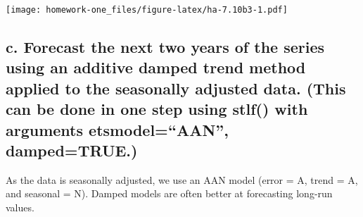 \documentclass[openany]{book}
\newenvironment{Shaded}{\begin{snugshade}}{\end{snugshade}}
\newcommand{\DataTypeTok}[1]{\textcolor[rgb]{0.13,0.29,0.53}{#1}}
\newcommand{\KeywordTok}[1]{\textcolor[rgb]{0.13,0.29,0.53}{\textbf{#1}}}
\newcommand{\NormalTok}[1]{#1}
\newcommand{\OperatorTok}[1]{\textcolor[rgb]{0.81,0.36,0.00}{\textbf{#1}}}
\newcommand{\StringTok}[1]{\textcolor[rgb]{0.31,0.60,0.02}{#1}}
\begin{document}
\begin{Shaded}
\end{Shaded}

\texttt{[image: homework-one\_files/figure-latex/ha-7.10b3-1.pdf]}

\hypertarget{c.-forecast-the-next-two-years-of-the-series-using-an-additive-damped-trend-method-applied-to-the-seasonally-adjusted-data.-this-can-be-done-in-one-step-using-stlf-with-arguments-etsmodelaan-dampedtrue.}{%
\subsection{c. Forecast the next two years of the series using an additive damped trend method applied to the seasonally adjusted data. (This can be done in one step using stlf() with arguments etsmodel=``AAN'', damped=TRUE.)}\label{c.-forecast-the-next-two-years-of-the-series-using-an-additive-damped-trend-method-applied-to-the-seasonally-adjusted-data.-this-can-be-done-in-one-step-using-stlf-with-arguments-etsmodelaan-dampedtrue.}}

As the data is seasonally adjusted, we use an AAN model (error = A, trend = A, and seasonal = N). Damped models are often better at forecasting long-run values.
\end{document}
